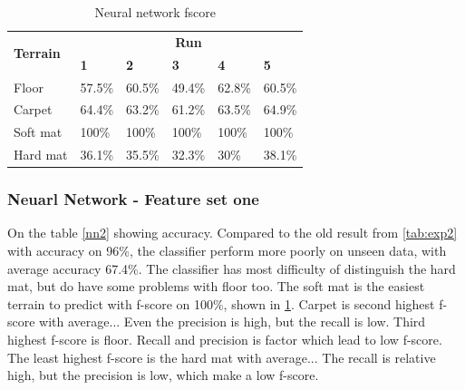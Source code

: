 \documentclass[USenglish]{ifimaster}  %
\begin{document}
	\begin{table}[h]
		\centering
		\begin{tabular}{@{}llllll@{}}
			\toprule
			\multirow{2}{*}{\textbf{Terrain}} & \multicolumn{5}{c}{\textbf{Run}} \\ \cmidrule(l){2-6} 
			& \multicolumn{1}{l|}{\textbf{1}} & \multicolumn{1}{l|}{\textbf{2}} & \multicolumn{1}{l|}{\textbf{3}} & \multicolumn{1}{l|}{\textbf{4}} & \textbf{5} \\ \midrule
			\multicolumn{1}{l|}{Floor} & \multicolumn{1}{l|}{57.5\%} & \multicolumn{1}{l|}{60.5\%} & \multicolumn{1}{l|}{49.4\%} & \multicolumn{1}{l|}{62.8\%} & 60.5\% \\ \midrule
			\multicolumn{1}{l|}{Carpet} & \multicolumn{1}{l|}{64.4\%} & \multicolumn{1}{l|}{63.2\%} & \multicolumn{1}{l|}{61.2\%} & \multicolumn{1}{l|}{63.5\%} & 64.9\% \\ \midrule
			\multicolumn{1}{l|}{Soft mat} & \multicolumn{1}{l|}{100\%} & \multicolumn{1}{l|}{100\%} & \multicolumn{1}{l|}{100\%} & \multicolumn{1}{l|}{100\%} & 100\% \\ \midrule
			\multicolumn{1}{l|}{Hard mat} & \multicolumn{1}{l|}{36.1\%} & \multicolumn{1}{l|}{35.5\%} & \multicolumn{1}{l|}{32.3\%} & \multicolumn{1}{l|}{30\%} & 38.1\% \\ \bottomrule
		\end{tabular}
		\caption{Neural network fscore}
		\label{nnfscore}
	\end{table}
	\FloatBarrier
	
	\subsubsection{Neuarl Network - Feature set one}
	On the table \ref{nn2} showing accuracy. Compared to the old result from \ref{tab:exp2} with accuracy on 96\%, the classifier perform more poorly on unseen data, with average accuracy 67.4\%. The classifier has most difficulty of distinguish the hard mat, but do have some problems with floor too. The soft mat is the easiest terrain to predict with f-score on 100\%, shown in \ref{nnfscore}. Carpet is second highest f-score with average... Even the precision is high, but the recall is low. Third highest f-score is floor. Recall and precision is factor which lead to low f-score. The least highest f-score is the hard mat with average... The recall is relative high, but the precision is low, which make a low f-score.
	
\end{document}
